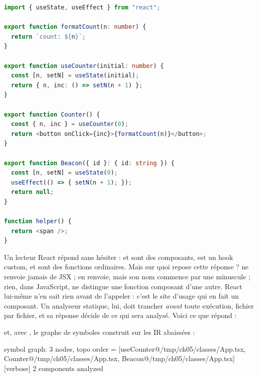 \begin{lstlisting}[language=TypeScript,caption={Quatre fonctions de niveau supérieur (\file{/tmp/ch05/classes/App.tsx})},label={lst:frontend-classes}]
import { useState, useEffect } from "react";

export function formatCount(n: number) {
  return `count: ${n}`;
}

export function useCounter(initial: number) {
  const [n, setN] = useState(initial);
  return { n, inc: () => setN(n + 1) };
}

export function Counter() {
  const { n, inc } = useCounter(0);
  return <button onClick={inc}>{formatCount(n)}</button>;
}

export function Beacon({ id }: { id: string }) {
  const [n, setN] = useState(0);
  useEffect(() => { setN(n + 1); });
  return null;
}

function helper() {
  return <span />;
}
\end{lstlisting}

Un lecteur React répond sans hésiter :  et  sont des composants,  est un hook custom,  et  sont des fonctions ordinaires. Mais sur quoi repose cette réponse ?  ne renvoie jamais de JSX ;  en renvoie, mais son nom commence par une minuscule ; rien, dans JavaScript, ne distingue une fonction \og composant\fg{} d'une autre. React lui-même n'en sait rien avant de l'appeler : c'est le site d'usage  qui en fait un composant. Un analyseur statique, lui, doit trancher \emph{avant} toute exécution, fichier par fichier, et sa réponse décide de ce qui sera analysé. Voici ce que \reactant{} répond :


\noindent et, avec , le graphe de symboles construit sur les IR abaissées :

\begin{sortie}
[verbose] symbol graph: 3 nodes, topo order = [useCounter@/tmp/ch05/classes/App.tsx, Counter@/tmp/ch05/classes/App.tsx, Beacon@/tmp/ch05/classes/App.tsx]
[verbose] 2 components analyzed
\end{sortie}

